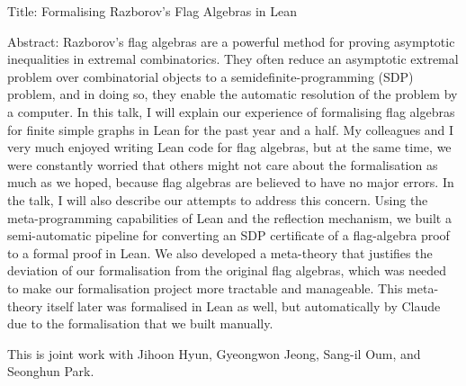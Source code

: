 Title: Formalising Razborov's Flag Algebras in Lean

Abstract: 
Razborov's flag algebras are a powerful method for proving asymptotic inequalities in
extremal combinatorics. They often reduce an asymptotic extremal problem over combinatorial objects to a
semidefinite-programming (SDP) problem, and in doing so, they enable the automatic resolution 
of the problem by a computer. In this talk, I will explain our experience of formalising flag algebras 
for finite simple graphs in Lean for the past year and a half. My colleagues and I very much enjoyed 
writing Lean code for flag algebras, but at the same time, we were constantly worried that others 
might not care about the formalisation as much as we hoped, because flag algebras are believed to
have no major errors. In the talk, I will also describe our attempts to address this concern. Using the meta-programming
capabilities of Lean and the reflection mechanism, we built a semi-automatic pipeline for converting 
an SDP certificate of a flag-algebra proof to a formal proof in Lean. We also developed a meta-theory that
justifies the deviation of our formalisation from the original flag algebras, which was needed to make our 
formalisation project more tractable and manageable. This meta-theory itself later was formalised in Lean as well,
but automatically by Claude due to the formalisation that we built manually. 

This is joint work with Jihoon Hyun, Gyeongwon Jeong, Sang-il Oum, and Seonghun Park.
